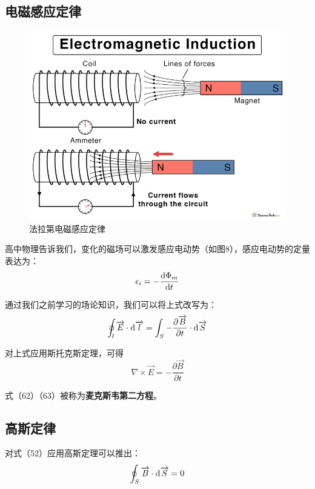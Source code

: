 \documentclass[UTF8,a4paper,11pt]{article}
\begin{document}
\subsection{电磁感应定律}
\begin{figure}[htbp]
\centering
\includegraphics[scale=0.3]{p8.jpg}
\caption{法拉第电磁感应定律}
\end{figure}
高中物理告诉我们，变化的磁场可以激发感应电动势（如图8），感应电动势的定量表达为：
\begin{equation}
\epsilon_i=-\frac{{\rm d}\Phi_m}{{\rm d}t}
\end{equation}

通过我们之前学习的场论知识，我们可以将上式改写为：
\begin{equation}
\oint_l\overrightarrow{E}\cdot{\rm d}\overrightarrow{l}=\int_S-\frac{\partial\overrightarrow{B}}{\partial t}\cdot{\rm d}\overrightarrow{S}
\end{equation}

对上式应用斯托克斯定理，可得
\begin{equation}
\nabla\times\overrightarrow{E}=-\frac{\partial\overrightarrow{B}}{\partial t}
\end{equation}

式（62）（63）被称为\textbf{麦克斯韦第二方程}。

\subsection{高斯定律}
对式（52）应用高斯定理可以推出：
\begin{equation}
\oint_S\overrightarrow{B}\cdot{\rm d}\overrightarrow{S}=0
\end{equation}
\end{document}
